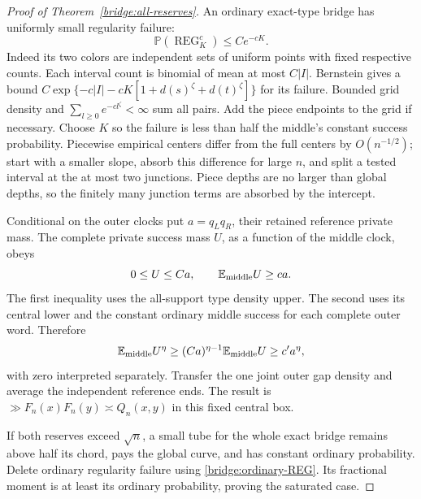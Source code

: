 \begin{proof}[Proof of Theorem~\ref{bridge:all-reserves}]
An ordinary exact-type bridge has uniformly small regularity failure:
\begin{equation}
 \mathbb P(\operatorname{REG}_K^c)\le Ce^{-cK}.
 \label{bridge:ordinary-REG}
\end{equation}
Indeed its two colors are independent sets of uniform points with
fixed respective counts. Each interval count is binomial of mean at
most $C|I|$. Bernstein gives a bound
$C\exp\{-c|I|-cK[1+d(s)^\zeta+d(t)^\zeta]\}$ for its failure.
Bounded grid density and $\sum_{l\ge0}e^{-cl^\zeta}<\infty$
sum all pairs. Add the piece endpoints to the grid if necessary.
Choose $K$ so the failure is less than half the middle's constant
success probability. Piecewise empirical centers differ from the
full centers by $O(n^{-1/2})$; start with a smaller slope, absorb
this difference for large $n$, and split a tested interval at the
at most two junctions. Piece depths are no larger than global depths,
so the finitely many junction terms are absorbed by the intercept.

Conditional on the outer clocks put $a=q_Lq_R$, their retained
reference private mass. The complete private success mass $U$, as
a function of the middle clock, obeys
\[
 0\le U\le Ca,\qquad \mathbb E_{\rm middle}U\ge ca.
\]
The first inequality uses the all-support type density upper. The
second uses its central lower and the constant ordinary middle
success for each complete outer word. Therefore
\begin{equation}
 \mathbb E_{\rm middle}U^\eta
 \ge(Ca)^{\eta-1}\mathbb E_{\rm middle}U\ge c'a^\eta,
 \label{bridge:integrate-before-power}
\end{equation}
with zero interpreted separately. Transfer the one joint outer gap
density and average the independent reference ends. The result is
$\gg F_n(x)F_n(y)\asymp Q_n(x,y)$ in this fixed central box.

If both reserves exceed $\sqrt n$, a small tube for the whole exact
bridge remains above half its chord, pays the global curve, and has
constant ordinary probability. Delete ordinary regularity failure
using \eqref{bridge:ordinary-REG}. Its fractional moment is at least
its ordinary probability, proving the saturated case.


\end{proof}
